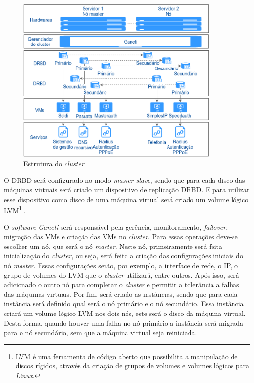 \begin{figure}[h!]
 \centering
 \includegraphics[width=380px]{img/projeto_estrutura.eps}
 \caption{Estrutura do \textit{cluster}.}
 \label{fig:projeto_estrutura}
\end{figure}

O \ac{DRBD} será configurado no modo \textit{master-slave}, sendo que para cada disco das máquinas virtuais será criado um dispositivo de 
replicação \ac{DRBD}. E para utilizar esse dispositivo como disco de uma máquina virtual será criado um volume lógico 
\ac{LVM}\footnote{LVM é uma ferramenta de código aberto que possibilita a manipulação de discos rígidos, através da criação de grupos de volumes 
e volumes lógicos para \textit{Linux}.} \cite{lvm}. 

O \textit{software} \textit{Ganeti} será responsável pela gerência, monitoramento, \textit{failover}, migração das \ac{VM}s e criação das \ac{VM}s 
no \textit{cluster}. Para essas operações deve-se escolher um nó, que será o nó \textit{master}. Neste nó, primeiramente será feita inicialização 
do \textit{cluster}, ou seja, será feito a criação das configurações iniciais do nó \textit{master}. Essas configurações serão, por exemplo, 
a interface de rede, o \ac{IP}, o grupo de volumes do \ac{LVM} que o \textit{cluster} utilizará, entre outros. Após isso, será adicionado o outro 
nó para completar o \textit{cluster} e permitir a tolerância a falhas das máquinas virtuais. Por fim, será criado as instâncias, sendo que para 
cada instância será definido qual será o nó primário e o nó secundário. Essa instância criará um volume lógico \ac{LVM} nos dois nós, este será
o disco da máquina virtual. Desta forma, quando houver uma falha no nó primário a instância será migrada para o nó secundário, sem que a máquina 
virtual seja reiniciada.

